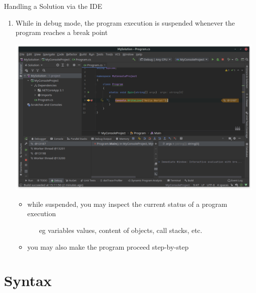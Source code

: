 \documentclass[presentation]{beamer}
\begin{document}
\begin{frame}[allowframebreaks]{Handling a Solution via the IDE}
\begin{enumerate}
        \framebreak
    
        \item While in debug mode, the program execution is suspended whenever the program \alert{reaches} a break point
        \begin{center}
            \includegraphics[width=.6\linewidth]{img/rider-6}
        \end{center}
        \begin{itemize}
            \item while suspended, you may \alert{inspect} the current status of a program execution
            \begin{itemize}
                \item[eg] variables values, content of objects, call stacks, etc.
            \end{itemize}
            \item you may also make the program proceed \alert{step-by-step}
        \end{itemize}

    \end{enumerate}

\end{frame}

\section{\csharp Syntax}
\end{document}
